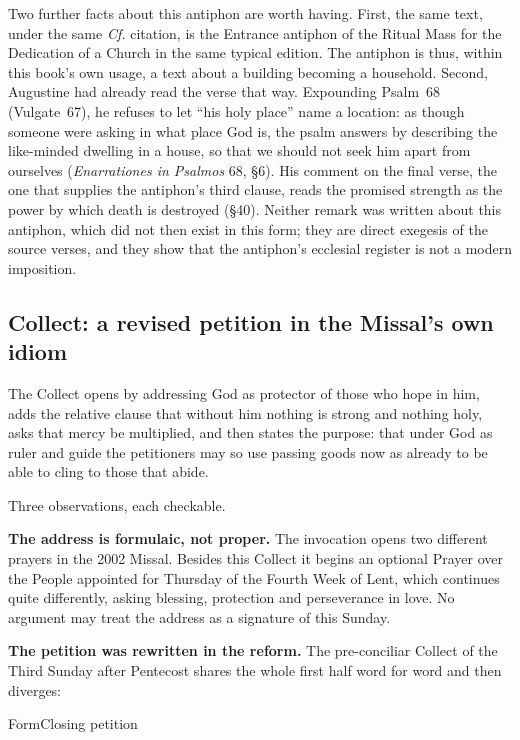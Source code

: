 Two further facts about this antiphon are worth having. First, the same text, under the same \emph{Cf.} citation, is the Entrance antiphon of the Ritual Mass for the Dedication of a Church in the same typical edition. The antiphon is thus, within this book's own usage, a text about a building becoming a household. Second, Augustine had already read the verse that way. Expounding Psalm~68 (Vulgate~67), he refuses to let ``his holy place'' name a location: as though someone were asking in what place God is, the psalm answers by describing the like-minded dwelling in a house, so that we should not seek him apart from ourselves (\emph{Enarrationes in Psalmos} 68, §6). His comment on the final verse, the one that supplies the antiphon's third clause, reads the promised strength as the power by which death is destroyed (§40). Neither remark was written about this antiphon, which did not then exist in this form; they are direct exegesis of the source verses, and they show that the antiphon's ecclesial register is not a modern imposition.

\subsection*{Collect: a revised petition in the Missal's own idiom}

The Collect opens by addressing God as protector of those who hope in him, adds the relative clause that without him nothing is strong and nothing holy, asks that mercy be multiplied, and then states the purpose: that under God as ruler and guide the petitioners may so use passing goods now as already to be able to cling to those that abide.

Three observations, each checkable.

\textbf{The address is formulaic, not proper.} The invocation  opens two different prayers in the 2002 Missal. Besides this Collect it begins an optional Prayer over the People appointed for Thursday of the Fourth Week of Lent, which continues quite differently, asking blessing, protection and perseverance in love. No argument may treat the address as a signature of this Sunday.

\textbf{The petition was rewritten in the reform.} The pre-conciliar Collect of the Third Sunday after Pentecost shares the whole first half word for word and then diverges:

\begin{twocoltable}{Form}{Closing petition}
\end{twocoltable}

